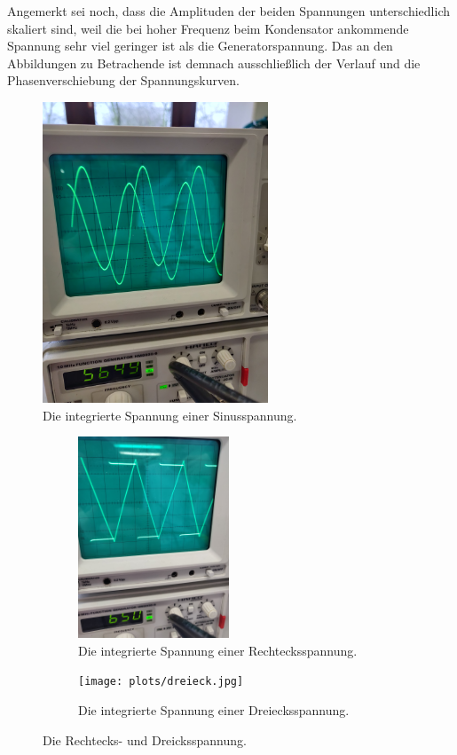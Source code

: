 Angemerkt sei noch, dass die Amplituden der beiden Spannungen unterschiedlich skaliert sind, weil die bei hoher Frequenz 
beim Kondensator ankommende Spannung sehr viel geringer ist als die Generatorspannung. 
Das an den Abbildungen zu Betrachende ist demnach ausschließlich der Verlauf und die Phasenverschiebung der Spannungskurven. 

\begin{figure}
    \centering
    \includegraphics[angle=-90,width=0.6\textwidth]{plots/sinus.jpg}
    \caption{Die integrierte Spannung einer Sinusspannung.}
    \label{fig:int_sinus}
\end{figure}

\begin{figure}
    \centering
    \begin{subfigure}{0.48\textwidth}
        \centering
        \includegraphics[height=6cm,angle=-90]{plots/rechteck.jpg}
        \caption{Die integrierte Spannung einer Rechtecksspannung.}
        \label{fig:int_rechteck}
    \end{subfigure}
    \begin{subfigure}{0.48\textwidth}
        \centering
        \texttt{[image: plots/dreieck.jpg]}
        \caption{Die integrierte Spannung einer Dreiecksspannung.}
        \label{fig:int_dreieck}
    \end{subfigure}
    \caption{Die Rechtecks- und Dreicksspannung.}
    \label{fig:rechtdrei}
\end{figure}
